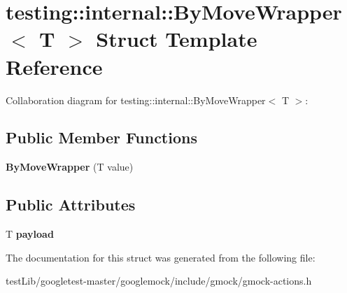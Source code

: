 \hypertarget{structtesting_1_1internal_1_1ByMoveWrapper}{}\section{testing\+:\+:internal\+:\+:By\+Move\+Wrapper$<$ T $>$ Struct Template Reference}
\label{structtesting_1_1internal_1_1ByMoveWrapper}


Collaboration diagram for testing\+:\+:internal\+:\+:By\+Move\+Wrapper$<$ T $>$\+:
\subsection*{Public Member Functions}
\begin{DoxyCompactItemize}
\item 
\mbox{\label{structtesting_1_1internal_1_1ByMoveWrapper_a60df33395785e0bfc5f72fba32376349}} 
{\bfseries By\+Move\+Wrapper} (T value)
\end{DoxyCompactItemize}
\subsection*{Public Attributes}
\begin{DoxyCompactItemize}
\item 
\mbox{\label{structtesting_1_1internal_1_1ByMoveWrapper_ae8407b1ae99db3f00797d68b9ee9e870}} 
T {\bfseries payload}
\end{DoxyCompactItemize}


The documentation for this struct was generated from the following file\+:\begin{DoxyCompactItemize}
\item 
test\+Lib/googletest-\/master/googlemock/include/gmock/gmock-\/actions.\+h\end{DoxyCompactItemize}
